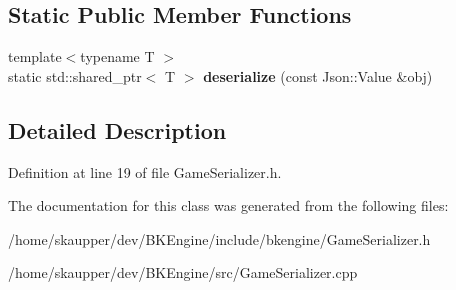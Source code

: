 \subsection*{Static Public Member Functions}
\begin{DoxyCompactItemize}
\item 
\mbox{\label{classbkengine_1_1GameSerializer_a1eed5a6aa6012dda21172db8b5e8714a}} 
{\footnotesize template$<$typename T $>$ }\\static std\+::shared\+\_\+ptr$<$ T $>$ {\bfseries deserialize} (const Json\+::\+Value \&obj)
\end{DoxyCompactItemize}


\subsection{Detailed Description}


Definition at line 19 of file Game\+Serializer.\+h.



The documentation for this class was generated from the following files\+:\begin{DoxyCompactItemize}
\item 
/home/skaupper/dev/\+B\+K\+Engine/include/bkengine/Game\+Serializer.\+h\item 
/home/skaupper/dev/\+B\+K\+Engine/src/Game\+Serializer.\+cpp\end{DoxyCompactItemize}
